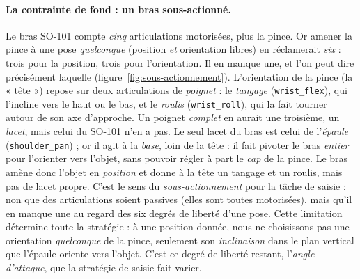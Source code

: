 \paragraph{La contrainte de fond : un bras sous-actionné.} Le bras SO-101 compte \emph{cinq} articulations motorisées, plus la pince. Or amener la pince à une pose \emph{quelconque} (position \emph{et} orientation libres) en réclamerait \emph{six} : trois pour la position, trois pour l'orientation. Il en manque une, et l'on peut dire précisément laquelle (figure~\ref{fig:sous-actionnement}). L'orientation de la pince (la « tête ») repose sur deux articulations de \emph{poignet} : le \emph{tangage} (\texttt{wrist\_flex}), qui l'incline vers le haut ou le bas, et le \emph{roulis} (\texttt{wrist\_roll}), qui la fait tourner autour de son axe d'approche. Un poignet \emph{complet} en aurait une troisième, un \emph{lacet}, mais celui du SO-101 n'en a pas. Le seul lacet du bras est celui de l'\emph{épaule} (\texttt{shoulder\_pan}) ; or il agit à la \emph{base}, loin de la tête : il fait pivoter le bras \emph{entier} pour l'orienter vers l'objet, sans pouvoir régler à part le \emph{cap} de la pince. Le bras amène donc l'objet en \emph{position} et donne à la tête un tangage et un roulis, mais pas de lacet propre. C'est le sens du \emph{sous-actionnement} pour la tâche de saisie : non que des articulations soient passives (elles sont toutes motorisées), mais qu'il en manque une au regard des six degrés de liberté d'une pose. Cette limitation détermine toute la stratégie : à une position donnée, nous ne choisissons pas une orientation \emph{quelconque} de la pince, seulement son \emph{inclinaison} dans le plan vertical que l'épaule oriente vers l'objet. C'est ce degré de liberté restant, l'\emph{angle d'attaque}, que la stratégie de saisie fait varier.

